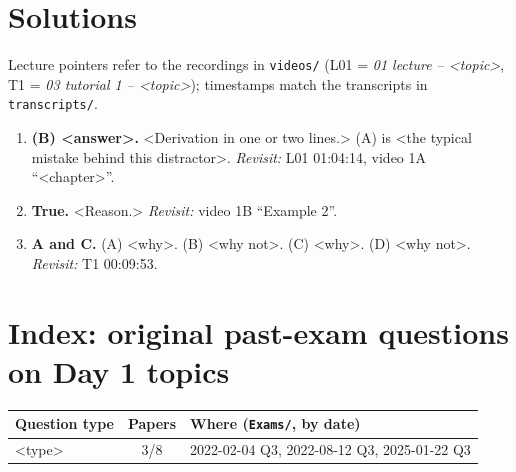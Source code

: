 \documentclass[11pt,a4paper]{article}
\newcommand{\papers}{8}
\newcounter{q}
\begin{document}
\section*{Solutions}
Lecture pointers refer to the recordings in \texttt{videos/} (L01 = \emph{01 lecture -- <topic>}, T1 = \emph{03 tutorial 1 -- <topic>}); timestamps match the transcripts in \texttt{transcripts/}.

\begin{enumerate}[label=\textbf{Q\arabic*.},leftmargin=*,itemsep=6pt]
\item \textbf{(B) <answer>.} <Derivation in one or two lines.> (A) is <the typical mistake behind this distractor>. \emph{Revisit:} L01 01:04:14, video 1A ``<chapter>''.
\item \textbf{True.} <Reason.> \emph{Revisit:} video 1B ``Example 2''.
\item \textbf{A and C.} (A) <why>. (B) <why not>. (C) <why>. (D) <why not>. \emph{Revisit:} T1 00:09:53.
\end{enumerate}

\section*{Index: original past-exam questions on Day 1 topics}
\begin{center}\small
\begin{tabular}{p{7.2cm}cp{6.2cm}}
\toprule
Question type & Papers & Where (\texttt{Exams/}, by date)\\
\midrule
<type> & 3/\papers & 2022-02-04 Q3, 2022-08-12 Q3, 2025-01-22 Q3\\
\bottomrule
\end{tabular}
\end{center}
\end{document}
